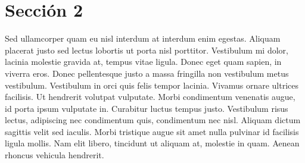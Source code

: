 
\section{Sección 2}

Sed ullamcorper quam eu nisl interdum at interdum enim egestas. Aliquam placerat justo sed lectus lobortis ut porta nisl porttitor. Vestibulum mi dolor, lacinia molestie gravida at, tempus vitae ligula. Donec eget quam sapien, in viverra eros. Donec pellentesque justo a massa fringilla non vestibulum metus vestibulum. Vestibulum in orci quis felis tempor lacinia. Vivamus ornare ultrices facilisis. Ut hendrerit volutpat vulputate. Morbi condimentum venenatis augue, id porta ipsum vulputate in. Curabitur luctus tempus justo. Vestibulum risus lectus, adipiscing nec condimentum quis, condimentum nec nisl. Aliquam dictum sagittis velit sed iaculis. Morbi tristique augue sit amet nulla pulvinar id facilisis ligula mollis. Nam elit libero, tincidunt ut aliquam at, molestie in quam. Aenean rhoncus vehicula hendrerit.